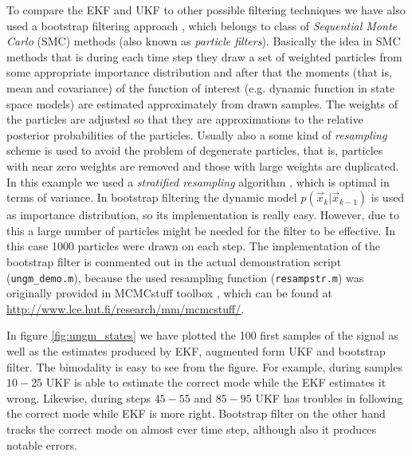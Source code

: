 To compare the EKF and UKF to other possible filtering techniques we
have also used a bootstrap filtering approach \citep{Gordon+Salmon+Smith:1993},
which belongs to class of {\it Sequential Monte Carlo} (SMC) methods
(also known as {\it particle filters}).  Basically the idea in SMC
methods that is during each time step they draw a set of weighted
particles from some appropriate importance distribution and after that
the moments (that is, mean and covariance) of the function of interest
(e.g. dynamic function in state space models) are estimated
approximately from drawn samples. The weights of the particles are
adjusted so that they are approximations to the relative posterior
probabilities of the particles. Usually also a some kind of {\it
resampling} scheme is used to avoid the problem of degenerate
particles, that is, particles with near zero weights are removed and
those with large weights are duplicated. In this example we used a
{\it stratified resampling} algorithm \citep{Kitagawa:1996}, which is
optimal in terms of variance. In bootstrap filtering the dynamic model
$p(\vec{x}_k|\vec{x}_{k-1})$ is used as importance distribution, so
its implementation is really easy.  However, due to this a large
number of particles might be needed for the filter to be effective. In
this case 1000 particles were drawn on each step. The implementation
of the bootstrap filter is commented out in the actual demonstration
script (\texttt{ungm\_demo.m}), because the used resampling function
(\texttt{resampstr.m}) was originally provided in MCMCstuff toolbox
\citep{Vanhatalo+Vehtari:2006}, which can be found at
\url{http://www.lce.hut.fi/research/mm/mcmcstuff/}.

In figure \ref{fig:ungm_states} we have plotted the 100 first samples
of the signal as well as the estimates produced by EKF, augmented form
UKF and bootstrap filter. The bimodality is easy to see from the
figure. For example, during samples $10-25$ UKF is able to estimate
the correct mode while the EKF estimates it wrong. Likewise, during
steps $45-55$ and $85-95$ UKF has troubles in following the correct
mode while EKF is more right. Bootstrap filter on the other hand
tracks the correct mode on almost ever time step, although also it
produces notable errors.

